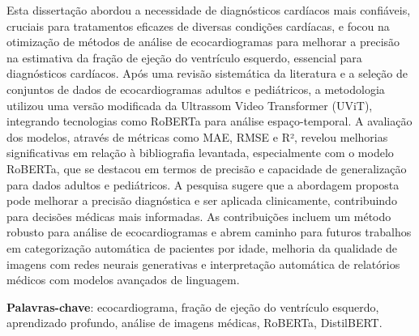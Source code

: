 \begin{resumo}


Esta dissertação abordou a necessidade de diagnósticos cardíacos mais confiáveis, cruciais para tratamentos eficazes de diversas condições cardíacas, e focou na otimização de métodos de análise de ecocardiogramas para melhorar a precisão na estimativa da fração de ejeção do ventrículo esquerdo, essencial para diagnósticos cardíacos. Após uma revisão sistemática da literatura e a seleção de conjuntos de dados de ecocardiogramas adultos e pediátricos, a metodologia utilizou uma versão modificada da Ultrassom Video Transformer (UViT), integrando tecnologias como RoBERTa para análise espaço-temporal. A avaliação dos modelos, através de métricas como MAE, RMSE e R², revelou melhorias significativas em relação à bibliografia levantada, especialmente com o modelo RoBERTa, que se destacou em termos de precisão e capacidade de generalização para dados adultos e pediátricos. A pesquisa sugere que a abordagem proposta pode melhorar a precisão diagnóstica e ser aplicada clinicamente, contribuindo para decisões médicas mais informadas. As contribuições incluem um método robusto para análise de ecocardiogramas e abrem caminho para futuros trabalhos em categorização automática de pacientes por idade, melhoria da qualidade de imagens com redes neurais generativas e interpretação automática de relatórios médicos com modelos avançados de linguagem.

{\hspace{-8mm} \bf{Palavras-chave}}: ecocardiograma, fração de ejeção do ventrículo esquerdo, aprendizado profundo, análise de imagens médicas, RoBERTa, DistilBERT.

\end{resumo}

